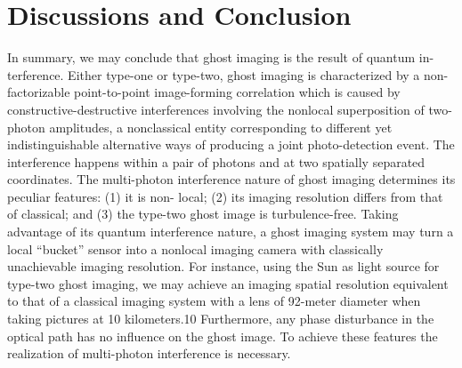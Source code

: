 
\chapter{Discussions and Conclusion} %

\label{Chapter5} %


In summary, we may conclude that ghost imaging is the result of quantum in- terference. Either type-one or type-two, ghost imaging is characterized by a non-factorizable point-to-point image-forming correlation which is caused by constructive-destructive interferences involving the nonlocal superposition of two-photon amplitudes, a nonclassical entity corresponding to different yet indistinguishable alternative ways of producing a joint photo-detection event. The interference happens within a pair of photons and at two spatially separated coordinates. The multi-photon interference nature of ghost imaging determines its peculiar features: (1) it is non- local; (2) its imaging resolution differs from that of classical; and (3) the type-two ghost image is turbulence-free. Taking advantage of its quantum interference nature, a ghost imaging system may turn a local “bucket” sensor into a nonlocal imaging camera with classically unachievable imaging resolution. For instance, using the Sun as light source for type-two ghost imaging, we may achieve an imaging spatial resolution equivalent to that of a classical imaging system with a lens of 92-meter diameter when taking pictures at 10 kilometers.10 Furthermore, any phase disturbance in the optical path has no influence on the ghost image. To achieve these features the realization of multi-photon interference is necessary\cite{physicsGhost}.